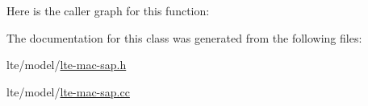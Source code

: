 Here is the caller graph for this function\+:




The documentation for this class was generated from the following files\+:\begin{DoxyCompactItemize}
\item 
lte/model/\hyperlink{lte-mac-sap_8h}{lte-\/mac-\/sap.\+h}\item 
lte/model/\hyperlink{lte-mac-sap_8cc}{lte-\/mac-\/sap.\+cc}\end{DoxyCompactItemize}
